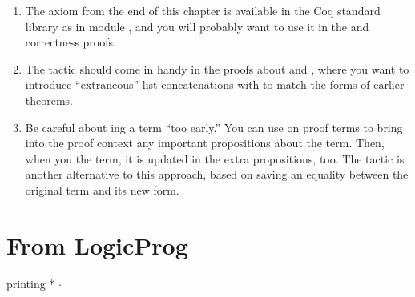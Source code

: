 \documentclass[12pt]{report}
\begin{document}
\begin{enumerate}
\begin{enumerate}
  \item The  axiom from the end of this chapter is available in the Coq standard library as  in module , and you will probably want to use it in the  and  correctness proofs.
  \item The  tactic should come in handy in the proofs about  and , where you want to introduce ``extraneous'' list concatenations with  to match the forms of earlier theorems.
  \item Be careful about ing a term ``too early.''  You can use  on proof terms to bring into the proof context any important propositions about the term.  Then, when you  the term, it is updated in the extra propositions, too.  The  tactic is another alternative to this approach, based on saving an equality between the original term and its new form.
\end{enumerate}



\end{enumerate} 

\section{From LogicProg}



 printing * $\cdot$ 
\end{document}
